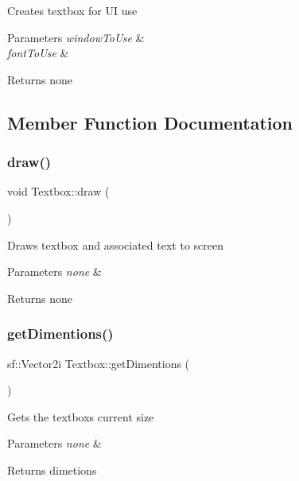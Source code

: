 Creates textbox for UI use


\begin{DoxyParams}{Parameters}
{\em window\+To\+Use} & \\
\hline
{\em font\+To\+Use} & \\
\hline
\end{DoxyParams}
\begin{DoxyReturn}{Returns}
none 
\end{DoxyReturn}


\subsection{Member Function Documentation}
\mbox{\label{classTextbox_a164e6dfbd1964b36b05de0cf84d07abf}} 
\subsubsection{\texorpdfstring{draw()}{draw()}}
{\footnotesize\ttfamily void Textbox\+::draw (\begin{DoxyParamCaption}{ }\end{DoxyParamCaption})}

Draws textbox and associated text to screen


\begin{DoxyParams}{Parameters}
{\em none} & \\
\hline
\end{DoxyParams}
\begin{DoxyReturn}{Returns}
none 
\end{DoxyReturn}
\mbox{\label{classTextbox_a44e7f5e3425245979a682e37748e3463}} 
\subsubsection{\texorpdfstring{get\+Dimentions()}{getDimentions()}}
{\footnotesize\ttfamily sf\+::\+Vector2i Textbox\+::get\+Dimentions (\begin{DoxyParamCaption}{ }\end{DoxyParamCaption})}

Gets the textbox\textquotesingle{}s current size


\begin{DoxyParams}{Parameters}
{\em none} & \\
\hline
\end{DoxyParams}
\begin{DoxyReturn}{Returns}
dimetions 
\end{DoxyReturn}
\mbox{\label{classTextbox_a985949299db5b449611386bb260c0ec0}} 
